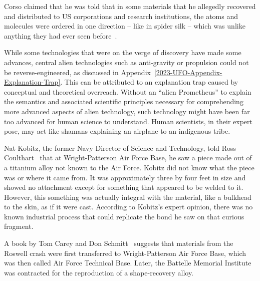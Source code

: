 



\label{2023-UFO-part-Perception-crash-retreivals-wkoam}

Corso claimed that he was told that in some materials that he allegedly recovered and distributed to US corporations and research institutions, the atoms and molecules were ordered in one direction -- like in spider silk -- which was unlike anything they had ever seen before~\cite{Corso1998Jun}.

While some technologies that were on the verge of discovery have made some advances, central alien technologies such as anti-gravity or
propulsion could not be reverse-engineered, as discussed in Appendix~\ref{2023-UFO-Appendix-Explanation-Trap}.
This can be attributed to an explanation trap caused by conceptual and theoretical overreach.
Without an ``alien Prometheus'' to explain the semantics and associated scientific principles necessary for comprehending more advanced aspects of alien technology,
such technology might have been far too advanced for human science to understand.
Human scientists, in their expert pose, may act like shamans explaining an airplane to an indigenous tribe.

Nat Kobitz, the former Navy Director of Science and Technology, told Ross Coulthart~\cite{Coulthart2021Aug} that at Wright-Patterson Air Force Base, he saw a piece made out of a titanium alloy not known to the Air Force. Kobitz did not know what the piece was or where it came from. It was approximately three by four feet in size and showed no attachment except for something that appeared to be welded to it. However, this something was actually integral with the material, like a bulkhead to the skin, as if it were cast. According to Kobitz's expert opinion, there was no known industrial process that could replicate the bond he saw on that curious fragment.






A book by Tom Carey and Don Schmitt~\cite{CareySchmitt} suggests that materials from the Roswell crash were first transferred to Wright-Patterson Air Force Base, which was then called Air Force Technical Base. Later, the Battelle Memorial Institute was contracted for the reproduction of a shape-recovery alloy.

